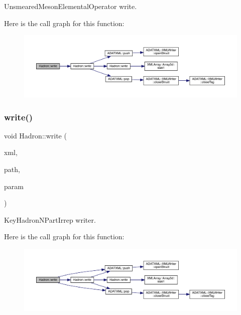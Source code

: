 Unsmeared\+Meson\+Elemental\+Operator write. 

Here is the call graph for this function\+:
\nopagebreak
\begin{figure}[H]
\begin{center}
\leavevmode
\includegraphics[width=350pt]{d1/daf/namespaceHadron_a78737ee2e9f7f708d926ec9f531c8f61_cgraph}
\end{center}
\end{figure}
\mbox{\label{namespaceHadron_a6789ce2b1b787b1f3136c9a2836448a1}} 
\subsubsection{\texorpdfstring{write()}{write()}\hspace{0.1cm}{\footnotesize\ttfamily [71/95]}}
{\footnotesize\ttfamily void Hadron\+::write (\begin{DoxyParamCaption}\item[{\mbox{\hyperlink{classADATXML_1_1XMLWriter}{X\+M\+L\+Writer}} \&}]{xml,  }\item[{const std\+::string \&}]{path,  }\item[{const \mbox{\hyperlink{structHadron_1_1KeyHadronNPartIrrepOp__t}{Key\+Hadron\+N\+Part\+Irrep\+Op\+\_\+t}} \&}]{param }\end{DoxyParamCaption})}



Key\+Hadron\+N\+Part\+Irrep writer. 

Here is the call graph for this function\+:
\nopagebreak
\begin{figure}[H]
\begin{center}
\leavevmode
\includegraphics[width=350pt]{d1/daf/namespaceHadron_a6789ce2b1b787b1f3136c9a2836448a1_cgraph}
\end{center}
\end{figure}
\mbox{\label{namespaceHadron_a04a5b512d84ea116e0714765e22cbc30}} 

